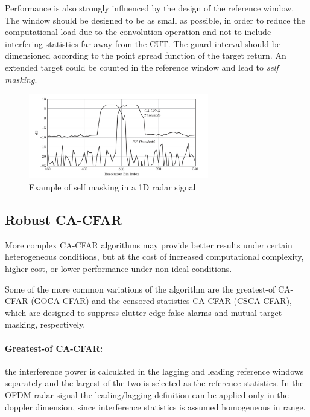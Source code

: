 Performance is also strongly influenced by the design of the reference window. The window should be designed to be as small as possible, in order to reduce the computational load due to the convolution operation and not to include interfering statistics far away from the CUT. The guard interval should be dimensioned according to the point spread function of the target return. An extended target could be counted in the reference window and lead to \textit{self masking}.

\begin{figure}[H]
	\centering
	\includegraphics[width=0.7\textwidth]{Images/radar_detect_threshold/self_masking_Richards2010.png}
	\caption{Example of self masking in a 1D radar signal \cite{Richards_Scheer_Holm_2010}}
	\label{fig:self_masking_Richards2010}
\end{figure}

\subsection{Robust CA-CFAR}
More complex CA-CFAR algorithms may provide better results under certain heterogeneous conditions, but at the cost of increased computational complexity, higher cost, or lower performance under non-ideal conditions.

Some of the more common variations of the algorithm are the greatest-of CA-CFAR (GOCA-CFAR) and the censored statistics CA-CFAR (CSCA-CFAR), which are designed to suppress clutter-edge false alarms and mutual target masking, respectively.

\paragraph{Greatest-of CA-CFAR:}
the interference power is calculated in the lagging and leading reference windows separately and the largest of the two is selected as the reference statistics. In the OFDM radar signal the leading/lagging definition can be applied only in the doppler dimension, since interference statistics is assumed homogeneous in range.

